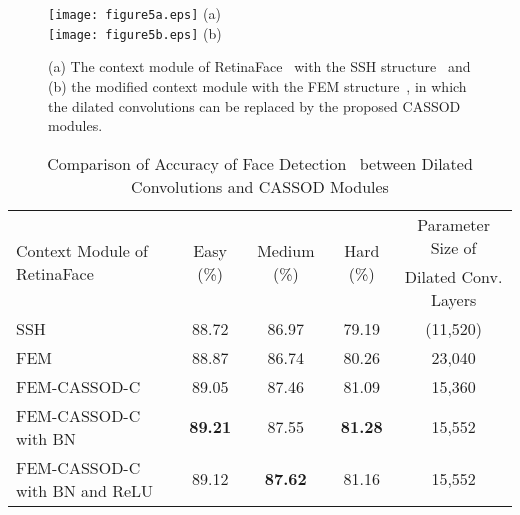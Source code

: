 \documentclass[10pt,twocolumn,letterpaper]{article}
\begin{document}
\begin{figure*}[t]
\begin{center}
   \texttt{[image: figure5a.eps]} (a)\\
   \texttt{[image: figure5b.eps]} (b)\\
\end{center}
   \caption{(a) The context module of RetinaFace~\cite{Deng19} with the SSH structure~\cite{Najibi17} and (b) the modified context module with the FEM structure~\cite{Li18_1}, in which the dilated convolutions can be replaced by the proposed CASSOD modules.}
\label{fig:dsfd}
\end{figure*}

\begin{table*}
\caption{Comparison of Accuracy of Face Detection~\cite{Deng19} between Dilated Convolutions and CASSOD Modules}
\begin{center}
\begin{tabular}{l|ccc|c}
\hline
  \multirow{2}{*}{Context Module of RetinaFace~\cite{Deng19}}    & \multirow{2}{*}{Easy (\%)}   & \multirow{2}{*}{Medium (\%)}    & \multirow{2}{*}{Hard (\%)}          & Parameter Size of     \\
                                                                 &                              &                                 &                                     & Dilated Conv. Layers  \\
\hline
  SSH                                                   & 88.72                        & 86.97                           & 79.19                                & (11,520)          \\
\hline
  FEM                                              & 88.87                        & 86.74                           & 80.26                                &  23,040               \\
  FEM-CASSOD-C                                     & 89.05                        & 87.46                           & 81.09                                &  15,360               \\
  FEM-CASSOD-C with BN                       & \textbf{89.21}               & 87.55                           & \textbf{81.28}                       &  15,552               \\
  FEM-CASSOD-C with BN and ReLU       & 89.12                        & \textbf{87.62}                  & 81.16                                &  15,552               \\                

\end{tabular}
\end{center}
\end{table*}
\end{document}
